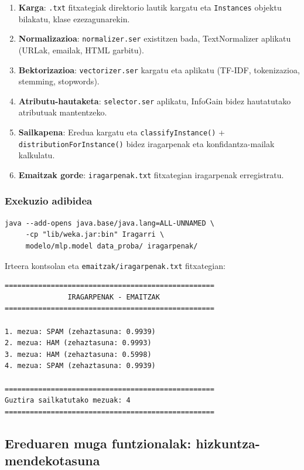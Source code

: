 \documentclass[12pt, a4paper]{article}
\begin{document}
\begin{enumerate}
    \item \textbf{Karga}: \texttt{.txt} fitxategiak direktorio lautik kargatu eta \texttt{Instances} objektu bilakatu, klase ezezagunarekin.
    \item \textbf{Normalizazioa}: \texttt{normalizer.ser} existitzen bada, TextNormalizer aplikatu (URLak, emailak, HTML garbitu).
    \item \textbf{Bektorizazioa}: \texttt{vectorizer.ser} kargatu eta aplikatu (TF-IDF, tokenizazioa, stemming, stopwords).
    \item \textbf{Atributu-hautaketa}: \texttt{selector.ser} aplikatu, InfoGain bidez hautatutako atributuak mantentzeko.
    \item \textbf{Sailkapena}: Eredua kargatu eta \texttt{classifyInstance()} + \texttt{distributionForInstance()} bidez iragarpenak eta konfidantza-mailak kalkulatu.
    \item \textbf{Emaitzak gorde}: \texttt{iragarpenak.txt} fitxategian iragarpenak erregistratu.
\end{enumerate}

\subsubsection*{Exekuzio adibidea}

\begin{verbatim}
java --add-opens java.base/java.lang=ALL-UNNAMED \
     -cp "lib/weka.jar:bin" Iragarri \
     modelo/mlp.model data_proba/ iragarpenak/
\end{verbatim}

Irteera kontsolan eta \texttt{emaitzak/iragarpenak.txt} fitxategian:

\begin{verbatim}
==================================================
               IRAGARPENAK - EMAITZAK             
==================================================

1. mezua: SPAM (zehaztasuna: 0.9939)
2. mezua: HAM (zehaztasuna: 0.9993)
3. mezua: HAM (zehaztasuna: 0.5998)
4. mezua: SPAM (zehaztasuna: 0.9939)

==================================================
Guztira sailkatutako mezuak: 4
==================================================
\end{verbatim}

\subsection{Ereduaren muga funtzionalak: hizkuntza-mendekotasuna}
\end{document}
